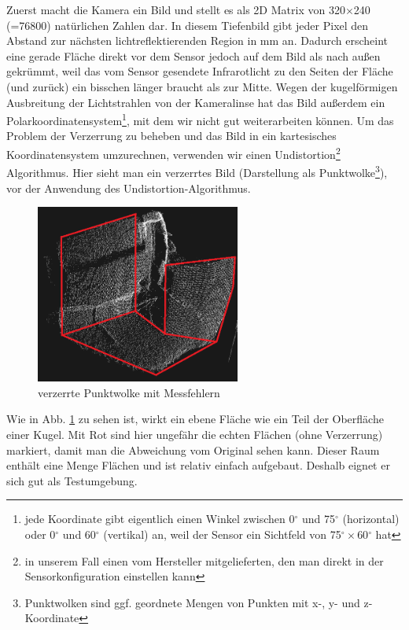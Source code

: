 \documentclass[a4paper,12pt,ngerman]{scrartcl}
\begin{document}
Zuerst macht die Kamera ein Bild und stellt es als 2D Matrix von 320$\times$240 (=76800) natürlichen Zahlen dar.
In diesem Tiefenbild gibt jeder Pixel den Abstand zur nächsten lichtreflektierenden Region in mm an. 
Dadurch erscheint eine gerade Fläche direkt vor dem Sensor jedoch auf dem Bild als nach außen gekrümmt, 
weil das vom Sensor gesendete Infrarotlicht zu den Seiten der Fläche (und zurück) ein bisschen länger
braucht als zur Mitte. Wegen der kugelförmigen Ausbreitung der Lichtstrahlen von der Kameralinse hat das
Bild außerdem ein Polarkoordinatensystem\footnote{jede Koordinate gibt eigentlich einen Winkel zwischen
	0$^{\circ}$ und 75$^{\circ}$ (horizontal) oder 0$^{\circ}$ und 60$^{\circ}$ (vertikal) an,
	 weil der Sensor ein Sichtfeld von 75$^{\circ}\times$60$^{\circ}$ hat}, mit dem wir nicht
gut weiterarbeiten können. Um das Problem der Verzerrung zu beheben und das Bild in ein kartesisches
Koordinatensystem umzurechnen, verwenden wir einen Undistortion\footnote{in unserem Fall einen
	vom Hersteller mitgelieferten, den man direkt in der Sensorkonfiguration einstellen kann} Algorithmus.
Hier sieht man ein verzerrtes Bild (Darstellung als Punktwolke\footnote{Punktwolken sind ggf. geordnete Mengen
von Punkten mit x-, y- und z-Koordinate}), vor der Anwendung des Undistortion-Algorithmus.
\begin{figure}[H] \label{distorted_pointcloud_img}
	\centering
	\includegraphics[width=0.6\textwidth]{no_undistortion2}
	\caption{verzerrte Punktwolke mit Messfehlern}
\end{figure}
Wie in Abb. \ref{distorted_pointcloud_img} zu sehen ist, wirkt ein ebene Fläche wie ein Teil der Oberfläche einer Kugel. Mit Rot sind hier ungefähr die echten Flächen (ohne Verzerrung) markiert, damit man die 
Abweichung vom Original sehen kann. Dieser Raum enthält eine Menge 
Flächen und ist relativ einfach aufgebaut. Deshalb eignet er sich gut als Testumgebung.
\end{document}
